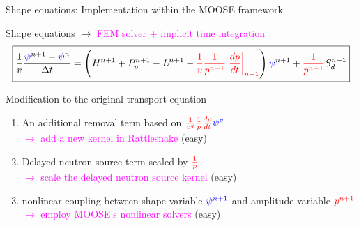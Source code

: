 \documentclass[8pt]{beamer}
\newcommand{\ben}{\begin{enumerate}}
\newcommand{\een}{\end{enumerate}}
\newcommand{\tcr}[1]{\textcolor{red}{#1}}
\newcommand{\tcb}[1]{\textcolor{blue}{#1}}
\newcommand{\tcm}[1]{\textcolor{magenta}{#1}}
\begin{document}
\begin{frame}{Shape equations: Implementation within the MOOSE framework}

\begin{block}{Shape equations $\to$ \tcm{FEM solver + implicit time integration}}
\begin{equation*}
\boxed{
\frac{1}{v}\frac{\tcb{\psi}^{n+1}-\tcb{\psi}^n }{\Delta t} = \left(H^{n+1} + P_p^{n+1} - L^{n+1} -\tcr{\frac{1}{v}\frac{1}{p^{n+1}}\left.\frac{dp}{dt}\right|_{n+1}} \right) \tcb{\psi}^{n+1}  + \tcr{\frac{1}{p^{n+1}}} S_{d}^{n+1} 
}
\end{equation*}
\end{block}

\begin{block}{Modification to the original transport equation}
\ben
\item An additional removal term based on $\tcr{\frac{1}{v^g}\frac{1}{p}\frac{dp}{dt}} \tcb{\psi^g}$\\
\tcm{$\to$ add a new kernel in Rattlesnake} (easy)
\item Delayed neutron source term scaled by $\tcr{\frac{1}{p}}$\\
\tcm{$\to$ scale the delayed neutron source kernel} (easy)
\item nonlinear coupling between shape variable $\tcb{\psi^{n+1}}$ and amplitude variable $\tcr{p^{n+1}}$\\
\tcm{$\to$ employ MOOSE's nonlinear solvers} (easy)
\een
\end{block}

\end{frame}

\end{document}
